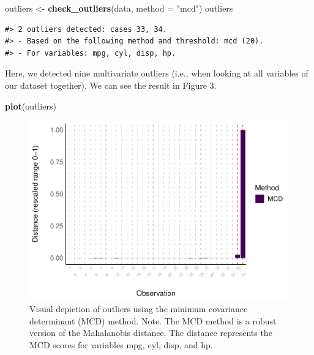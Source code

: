 \documentclass[sn-basic, lineno,pdflatex]{sn-jnl}
\newenvironment{Shaded}{\begin{snugshade}}{\end{snugshade}}
\newcommand{\AttributeTok}[1]{\textcolor[rgb]{0.13,0.29,0.53}{#1}}
\newcommand{\FunctionTok}[1]{\textcolor[rgb]{0.13,0.29,0.53}{\textbf{#1}}}
\newcommand{\NormalTok}[1]{#1}
\newcommand{\OtherTok}[1]{\textcolor[rgb]{0.56,0.35,0.01}{#1}}
\newcommand{\StringTok}[1]{\textcolor[rgb]{0.31,0.60,0.02}{#1}}
\begin{document}
\begin{Shaded}
\begin{Highlighting}[]
\NormalTok{outliers }\OtherTok{\textless{}{-}} \FunctionTok{check\_outliers}\NormalTok{(data, }\AttributeTok{method =} \StringTok{"mcd"}\NormalTok{)}
\NormalTok{outliers}
\end{Highlighting}
\end{Shaded}

\begin{verbatim}
#> 2 outliers detected: cases 33, 34.
#> - Based on the following method and threshold: mcd (20).
#> - For variables: mpg, cyl, disp, hp.
\end{verbatim}

Here, we detected nine multivariate outliers (i.e., when looking at all
variables of our dataset together). We can see the result in Figure 3.

\begin{Shaded}
\begin{Highlighting}[]
\FunctionTok{plot}\NormalTok{(outliers)}
\end{Highlighting}
\end{Shaded}

\begin{figure}
\includegraphics[width=1\linewidth]{paper_files/figure-latex/multivariate_implicit-1} \caption{Visual depiction of outliers using the minimum covariance determinant (MCD) method. Note. The MCD method is a robust version of the Mahalanobis distance. The distance represents the MCD scores for variables mpg, cyl, disp, and hp.}\label{fig:multivariate_implicit}
\end{figure}
\end{document}
